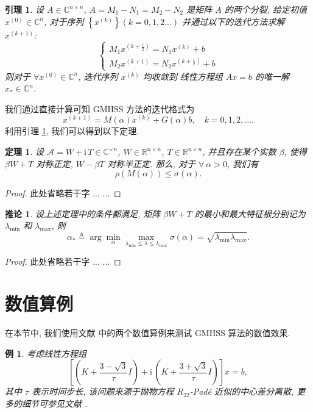 \documentclass[UTF8]{ctexart}
\theoremstyle{plain}
\newtheorem{theorem}{定理}[section]
\newtheorem{lemma}{引理}[section]
\newtheorem{corollary}{推论}[section]
\newtheorem{example}{例}[section]
\theoremstyle{nonumberplain}
\newtheorem{proof}{证明}
\numberwithin{equation}{section} %
\newcommand{\CC}{\ensuremath{\mathbb{C}}}
\newcommand{\RR}{\ensuremath{\mathbb{R}}}
\newcommand{\A}{\mathcal{A}}
\newcommand{\lam}{\lambda}
\newcommand{\ii}{\bm{\mathrm{i}}\,} %
\begin{document}
\begin{lemma} \label{lemma1}
  设 $A \in \CC^{n\times n}$, $A=M_{1}-N_{1}=M_{2}-N_{2}$ 是矩阵 $A$ 的两个分裂,
  给定初值 $ x^{(0)} \in \CC^{n} $, 对于序列 $\left\{x^{(k)}\right\}(k = 0,1,2...)$
  并通过以下的迭代方法求解 $x^{(k+1)}$:
  $$
    \begin{cases}
      M_{1}x^{(k+\frac{1}{2})}=N_{1}x^{(k)}+b\\
      M_{2}x^{(k+1)}=N_{2}x^{(k+\frac{1}{2})}+b
    \end{cases}
  $$
  则对于 $\forall x^{(0)} \in\CC^{n}$, 迭代序列 ${x^{(k)}}$ 均收敛到
  线性方程组 $Ax=b$ 的唯一解 $x_* \in\CC^{n}$.
\end{lemma}

我们通过直接计算可知 GMHSS 方法的迭代格式为
\begin{equation}\label{GMHSS}
  x^{(k+1)} = M(\alpha) x^{(k)} + G(\alpha) b, \quad k=0,1,2,....
\end{equation}
利用引理 \ref{lemma1}, 我们可以得到以下定理.
\begin{theorem}\label{Th:GMHSS-convergence}
  设 $\A = W + \ii T \in\CC^{\times n}$, $W\in\RR^{n\times n}$, $T\in\RR^{n\times n}$,
  并且存在某个实数 $\beta$, 使得 $\beta W + T$ 对称正定, $W - \beta T$ 对称半正定.
  那么, 对于 $\forall\ \alpha > 0$, 我们有
  $$ \rho(M(\alpha)) \leq \sigma(\alpha). $$
\end{theorem}
\begin{proof}
  此处省略若干字 ... ...
\end{proof}

\begin{corollary}
  设上述定理中的条件都满足, 矩阵 $\beta W + T$
  的最小和最大特征根分别记为 $\lam_{\min}$ 和 $\lam_{\max}$, 则
  $$
    \alpha_* \triangleq \arg\min_{\alpha}
      \max_{\lam_{\min} \leq \lam \leq \lam_{\max}} \sigma(\alpha)
    =\sqrt{\lam_{\min}\lam_{\max}}.
  $$
\end{corollary}
\begin{proof}
  此处省略若干字 ... ...
\end{proof}

\section{数值算例}
在本节中, 我们使用文献 \cite{BBC10} 中的两个数值算例来测试
GMHSS 算法的数值效果.

\begin{example} \label{example11}
  考虑线性方程组
  $$
    \left[\left(K+\frac{3-\sqrt{3}}{\tau} I\right)
     + \ii\left(K+\frac{3+\sqrt{3}}{\tau} I\right)\right]x=b,
  $$
  其中 $\tau$ 表示时间步长,
  该问题来源于抛物方程 $R_{22}$-Pad\'{e} 近似的中心差分离散,
  更多的细节可参见文献 \cite{AK00,BBC10,BBC11}.
\end{example}
\end{document}
